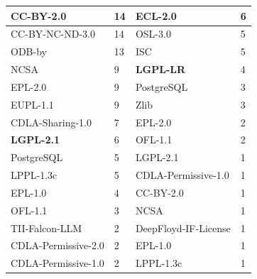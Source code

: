 \begin{table}[]
\begin{tabular}{|ll||ll|}
    \multicolumn{1}{|l|}{CC-BY-2.0} & 14 & \multicolumn{1}{l|}{ECL-2.0} & 6 \\ \hline
    \multicolumn{1}{|l|}{CC-BY-NC-ND-3.0} & 14 & \multicolumn{1}{l|}{OSL-3.0} & 5 \\ \hline
    \multicolumn{1}{|l|}{ODB-by} & 13 & \multicolumn{1}{l|}{ISC} & 5 \\ \hline
    \multicolumn{1}{|l|}{NCSA} & 9 & \multicolumn{1}{l|}{\textbf{LGPL-LR}} & 4 \\ \hline
    \multicolumn{1}{|l|}{EPL-2.0} & 9 & \multicolumn{1}{l|}{PostgreSQL} & 3 \\ \hline
    \multicolumn{1}{|l|}{EUPL-1.1} & 9 & \multicolumn{1}{l|}{Zlib} & 3 \\ \hline
    \multicolumn{1}{|l|}{CDLA-Sharing-1.0} & 7 & \multicolumn{1}{l|}{EPL-2.0} & 2 \\ \hline
    \multicolumn{1}{|l|}{\textbf{LGPL-2.1}} & 6 & \multicolumn{1}{l|}{OFL-1.1} & 2 \\ \hline
    \multicolumn{1}{|l|}{PostgreSQL} & 5 & \multicolumn{1}{l|}{LGPL-2.1} & 1 \\ \hline
    \multicolumn{1}{|l|}{LPPL-1.3c} & 5 & \multicolumn{1}{l|}{CDLA-Permissive-1.0} & 1 \\ \hline
    \multicolumn{1}{|l|}{EPL-1.0} & 4 & \multicolumn{1}{l|}{CC-BY-2.0} & 1 \\ \hline
    \multicolumn{1}{|l|}{OFL-1.1} & 3 & \multicolumn{1}{l|}{NCSA} & 1 \\ \hline
    \multicolumn{1}{|l|}{TII-Falcon-LLM} & 2 & \multicolumn{1}{l|}{DeepFloyd-IF-License} & 1 \\ \hline
    \multicolumn{1}{|l|}{CDLA-Permissive-2.0} & 2 & \multicolumn{1}{l|}{EPL-1.0} & 1 \\ \hline
    \multicolumn{1}{|l|}{CDLA-Permissive-1.0} & 2 & \multicolumn{1}{l|}{LPPL-1.3c} & 1 \\ \hline
    \end{tabular}
\end{table}
